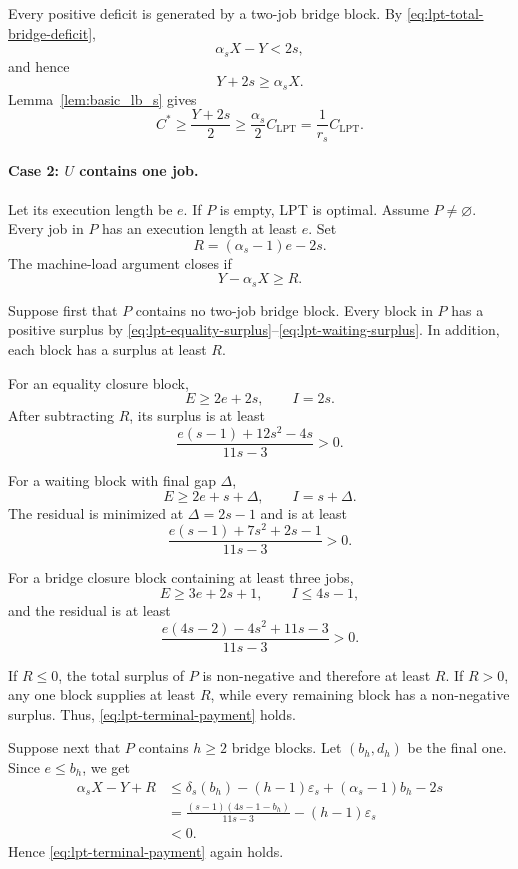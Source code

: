 \documentclass[11pt]{article}
\begin{document}
Every positive deficit is generated by a two-job bridge block. By
\eqref{eq:lpt-total-bridge-deficit},
\[
\alpha_sX-Y<2s,
\]
and hence
\[
Y+2s\ge\alpha_sX.
\]
Lemma~\ref{lem:basic_lb_s} gives
\[
C^*
\ge
\frac{Y+2s}{2}
\ge
\frac{\alpha_s}{2}C_{\mathrm{LPT}}
=
\frac1{r_s}C_{\mathrm{LPT}}.
\]

\paragraph{Case 2: \(U\) contains one job.}

Let its execution length be \(e\). If \(P\) is empty, LPT is optimal. Assume
\(P\ne\varnothing\). Every job in \(P\) has an execution length at least \(e\).
Set
\[
R=(\alpha_s-1)e-2s.
\tag{A.12}
\label{eq:lpt-terminal-requirement}
\]
The machine-load argument closes if
\[
Y-\alpha_sX\ge R.
\tag{A.13}
\label{eq:lpt-terminal-payment}
\]

Suppose first that \(P\) contains no two-job bridge block. Every block in
\(P\) has a positive surplus by
\eqref{eq:lpt-equality-surplus}--\eqref{eq:lpt-waiting-surplus}. In addition,
each block has a surplus at least \(R\).

For an equality closure block,
\[
E\ge2e+2s,
\qquad
I=2s.
\]
After subtracting \(R\), its surplus is at least
\[
\frac{e(s-1)+12s^2-4s}{11s-3}>0.
\]

For a waiting block with final gap \(\Delta\),
\[
E\ge2e+s+\Delta,
\qquad
I=s+\Delta.
\]
The residual is minimized at \(\Delta=2s-1\) and is at least
\[
\frac{e(s-1)+7s^2+2s-1}{11s-3}>0.
\]

For a bridge closure block containing at least three jobs,
\[
E\ge3e+2s+1,
\qquad
I\le4s-1,
\]
and the residual is at least
\[
\frac{e(4s-2)-4s^2+11s-3}{11s-3}>0.
\]

If \(R\le0\), the total surplus of \(P\) is non-negative and therefore at
least \(R\). If \(R>0\), any one block supplies at least \(R\), while every
remaining block has a non-negative surplus. Thus,
\eqref{eq:lpt-terminal-payment} holds.

Suppose next that \(P\) contains \(h\ge2\) bridge blocks. Let
\((b_h,d_h)\) be the final one. Since \(e\le b_h\), we get 
\[
\begin{aligned}
\alpha_sX-Y+R
&\le
\delta_s(b_h)-(h-1)\varepsilon_s
 +(\alpha_s-1)b_h-2s\\
&=
\frac{(s-1)(4s-1-b_h)}{11s-3}
 -(h-1)\varepsilon_s\\
&<0.
\end{aligned}
\]
Hence \eqref{eq:lpt-terminal-payment} again holds.
\end{document}
